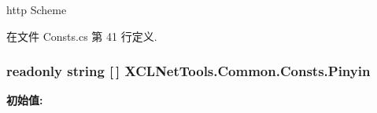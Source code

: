 http Scheme 



在文件 Consts.\-cs 第 41 行定义.

\hypertarget{class_x_c_l_net_tools_1_1_common_1_1_consts_af7c3e080af79d5034491651156a08f80}{
\subsubsection[{Pinyin}]{\setlength{\rightskip}{0pt plus 5cm}readonly string \mbox{[}$\,$\mbox{]} X\-C\-L\-Net\-Tools.\-Common.\-Consts.\-Pinyin\hspace{0.3cm}{\ttfamily [static]}}}\label{class_x_c_l_net_tools_1_1_common_1_1_consts_af7c3e080af79d5034491651156a08f80}
{\bfseries 初始值\-:}
